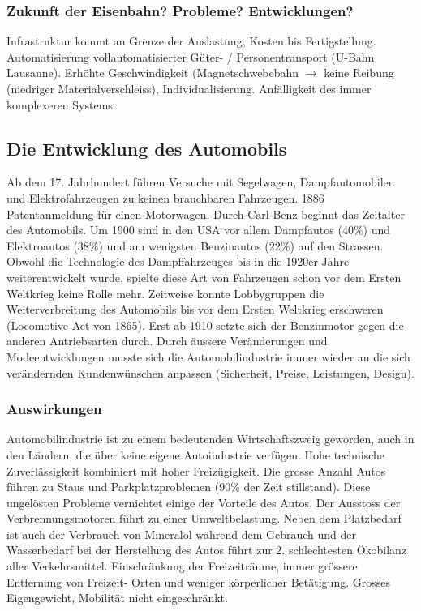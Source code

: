 \documentclass[10pt, openright=true]{scrartcl}
\begin{document}
\subsubsection{Zukunft der Eisenbahn? Probleme? Entwicklungen?}
Infrastruktur kommt an Grenze der Auslastung, Kosten bis Fertigstellung. Automatisierung vollautomatisierter Güter- / Personentransport (U-Bahn Lausanne). Erhöhte Geschwindigkeit (Magnetschwebebahn $  \rightarrow$ keine Reibung (niedriger Materialverschleiss), Individualisierung. Anfälligkeit des immer komplexeren Systems. \vspace{-0.2cm}
\subsection{Die Entwicklung des Automobils}
Ab dem 17. Jahrhundert führen Versuche mit Segelwagen, Dampfautomobilen und Elektrofahrzeugen zu keinen brauchbaren Fahrzeugen. 1886 Patentanmeldung für einen Motorwagen. Durch Carl Benz beginnt das Zeitalter des Automobils. Um 1900 sind in den USA vor allem Dampfautos (40\%) und Elektroautos (38\%) und am wenigsten Benzinautos (22\%) auf den Strassen. Obwohl die Technologie des Dampffahrzeuges bis in die 1920er Jahre weiterentwickelt wurde, spielte diese Art von Fahrzeugen schon vor dem Ersten Weltkrieg keine Rolle mehr. Zeitweise konnte Lobbygruppen die Weiterverbreitung des Automobils bis vor dem Ersten Weltkrieg erschweren (Locomotive Act von 1865). Erst ab 1910 setzte sich der Benzinmotor gegen die anderen Antriebsarten durch. Durch äussere Veränderungen und Modeentwicklungen musste sich die Automobilindustrie immer wieder an die sich verändernden Kundenwünschen anpassen (Sicherheit, Preise, Leistungen, Design). \vspace{-0.4cm}
\subsubsection{Auswirkungen}
Automobilindustrie ist zu einem bedeutenden Wirtschaftszweig geworden, auch in den Ländern, die über keine eigene Autoindustrie verfügen. Hohe technische Zuverlässigkeit kombiniert mit hoher Freizügigkeit. Die grosse Anzahl Autos führen zu Staus und Parkplatzproblemen (90\% der Zeit stillstand). Diese ungelösten Probleme vernichtet einige der Vorteile des Autos. Der Ausstoss der Verbrennungsmotoren führt zu einer Umweltbelastung. Neben dem Platzbedarf ist auch der Verbrauch von Mineralöl während dem Gebrauch und der Wasserbedarf bei der Herstellung des Autos führt zur 2. schlechtesten Ökobilanz aller Verkehrsmittel. Einschränkung der Freizeiträume, immer grössere Entfernung von Freizeit- Orten und weniger körperlicher Betätigung. Grosses Eigengewicht, Mobilität nicht eingeschränkt.
\end{document}
